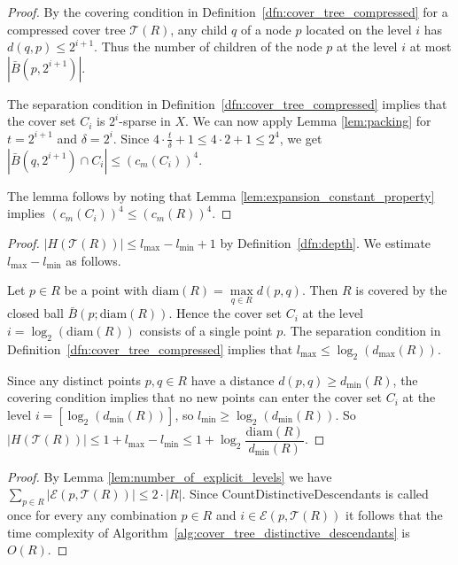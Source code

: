 \documentclass[a4paper,UKenglish,cleveref, autoref]{lipics-v2019}
\numberwithin{algocf}{section}
\theoremstyle{definition}
\theoremstyle{definition}
\theoremstyle{definition}
\theoremstyle{plain}
\newcommand{\T}{\mathcal{T}}
\newcommand{\rad}{\mathrm{diam}}
\begin{document}
\lemcompressedcovertreewidthbound*
\begin{proof}
By the covering condition in Definition~\ref{dfn:cover_tree_compressed} for a compressed cover tree $\T(R)$, any child $q$ of a node $p$ located on the level $i$ has $d(q,p) \leq 2^{i+1}$. Thus the number of children of the node $p$ at the level $i$ at most $|\bar{B}(p,2^{i+1})|$. 
\medskip

The separation condition in Definition~\ref{dfn:cover_tree_compressed} implies that the cover set $C_i$ is $2^{i}$-sparse in $X$. 
We can now apply Lemma \ref{lem:packing}
for $t = 2^{i+1}$ and $\delta = 2^{i}$. Since $4 \cdot \frac{t}{\delta} + 1 \leq 4 \cdot 2 + 1 \leq 2^4$, 
we get $|\bar{B}(q,2^{i+1}) \cap C_i|  \leq (c_m(C_{i}))^4$. 
\medskip

The lemma follows by noting that Lemma \ref{lem:expansion_constant_property} implies $(c_m(C_{i}))^4  \leq (c_m(R))^4 $.
\end{proof}

\lemdepthbound*
\begin{proof}
$|H(\T(R))|\leq l_{\max} - l_{\min}+1$ by Definition~\ref{dfn:depth}. 
We estimate $l_{\max} - l_{\min}$ as follows.
\medskip
 
Let $p \in R$ be a point with $\rad(R) = \max\limits_{q \in R}d(p,q)$. 
Then $R$ is covered by the closed ball $\bar B(p; \rad(R))$.
Hence the cover set $C_i$ at the level $i=\log_2(\rad(R))$ consists of a single point $p$. 
The separation condition in Definition~\ref{dfn:cover_tree_compressed} implies that 
 $l_{\max}\leq \log_2(d_{\max}(R))$.
\medskip

Since any distinct points $p,q \in R$ have a distance $d(p,q)\geq d_{\min}(R)$, the covering condition implies that no new points can enter the cover set $C_i$ at the level $i=[\log_2(d_{\min}(R))]$, so $l_{\min}\geq\log_2(d_{\min}(R))$.
So
$|H(\T(R))| \leq 1+l_{\max} - l_{\min} \leq 
1+\log_2\dfrac{\rad(R)}{d_{\min}(R)}$.
\end{proof}


\lemdistinctivedescendantsprecompute*
\begin{proof}
By Lemma \ref{lem:number_of_explicit_levels} we have $\sum_{p \in R}|\mathcal{E}(p,\T(R))| \leq 2 \cdot |R|.$ Since CountDistinctiveDescendants is called once for every any combination $p \in R$ and $i \in \mathcal{E}(p,\T(R))$ it follows that the time complexity of Algorithm~\ref{alg:cover_tree_distinctive_descendants} is $O(R)$.
\end{proof}
\end{document}
